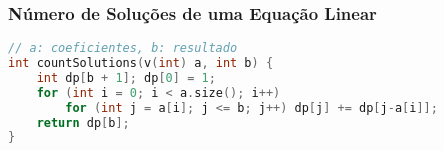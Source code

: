 \subsubsection{Número de Soluções de uma Equação Linear}
\begin{lstlisting}[language=C++]
// a: coeficientes, b: resultado
int countSolutions(v(int) a, int b) {
    int dp[b + 1]; dp[0] = 1;
    for (int i = 0; i < a.size(); i++)
        for (int j = a[i]; j <= b; j++) dp[j] += dp[j-a[i]];
    return dp[b];
}
\end{lstlisting}
